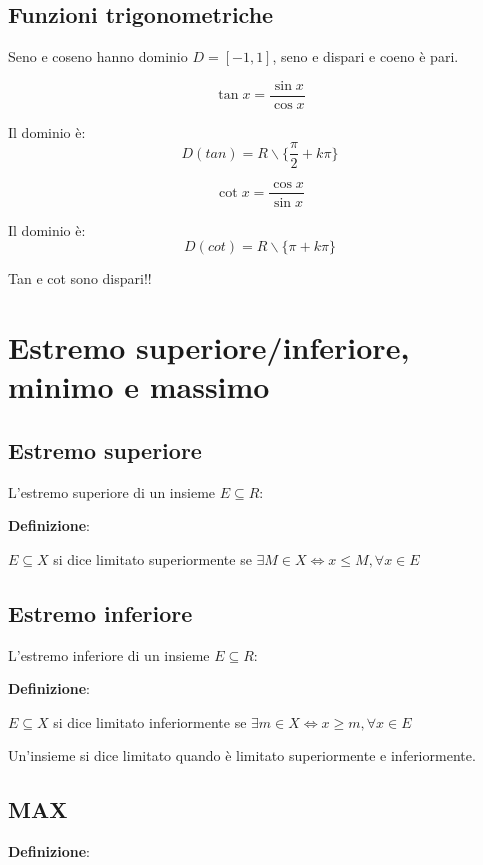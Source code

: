 \documentclass{article}
\begin{document}
\subsection{Funzioni trigonometriche}
Seno e coseno hanno dominio $D=[-1, 1]$, seno e dispari e coeno è pari.

\begin{equation*}
    \tan x = \frac{\sin x}{\cos x}
\end{equation*}

Il dominio è:
\begin{equation*}
    D(tan) = R \backslash \{ \frac{\pi}{2} + k\pi\}
\end{equation*}

\begin{equation*}
    \cot x = \frac{\cos x}{\sin x}
\end{equation*}

Il dominio è:
\begin{equation*}
    D(cot) = R \backslash \{ \pi + k\pi\}
\end{equation*}

Tan e cot sono dispari!!

\section{Estremo superiore/inferiore, minimo e massimo}

\subsection{Estremo superiore}
L'estremo superiore di un insieme $E \subseteq R$:

\textbf{Definizione}:


$E \subseteq X$ si dice limitato superiormente se $\exists M \in X \Leftrightarrow x\leq M, \forall x \in E$

\subsection{Estremo inferiore}
L'estremo inferiore di un insieme $E \subseteq R$:

\textbf{Definizione}:


$E \subseteq X$ si dice limitato inferiormente se $\exists m \in X \Leftrightarrow x\geq m, \forall x \in E$


Un'insieme si dice limitato quando è limitato superiormente e inferiormente.


\subsection{MAX}
\textbf{Definizione}:
\end{document}

